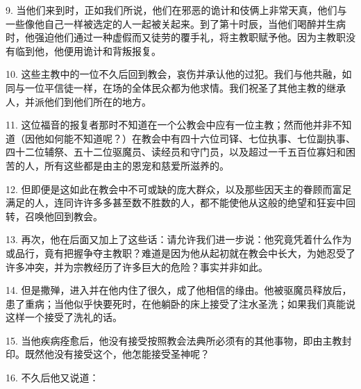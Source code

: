 \par

\par

9. 当他们来到时，正如我们所说，他们在邪恶的诡计和伎俩上非常天真，他们与一些像他自己一样被选定的人一起被关起来。到了第十时辰，当他们喝醉并生病时，他强迫他们通过一种虚假而又徒劳的覆手礼，将主教职赋予他。因为主教职没有临到他，他便用诡计和背叛报复。\par

10. 这些主教中的一位不久后回到教会，哀伤并承认他的过犯。我们与他共融，如同与一位平信徒一样，在场的全体民众都为他求情。我们祝圣了其他主教的继承人，并派他们到他们所在的地方。\par

11. 这位福音的报复者那时不知道在一个公教会中应有一位主教；然而他并非不知道（因他如何能不知道呢？）在教会中有四十六位司铎、七位执事、七位副执事、四十二位辅祭、五十二位驱魔员、读经员和守门员，以及超过一千五百位寡妇和困苦的人，所有这些都是由主的恩宠和慈爱所滋养的。\par

12. 但即便是这如此在教会中不可或缺的庞大群众，以及那些因天主的眷顾而富足满足的人，连同许许多多甚至数不胜数的人，都不能使他从这般的绝望和狂妄中回转，召唤他回到教会。\par

13. 再次，他在后面又加上了这些话：请允许我们进一步说：他究竟凭着什么作为或品行，竟有把握争夺主教职？难道是因为他从起初就在教会中长大，为她忍受了许多冲突，并为宗教经历了许多巨大的危险？事实并非如此。\par

14. 但是撒殚，进入并在他内住了很久，成了他相信的缘由。他被驱魔员释放后，患了重病；当他似乎快要死时，在他躺卧的床上接受了注水圣洗；如果我们真能说这样一个接受了洗礼的话。\par

15. 当他疾病痊愈后，他没有接受按照教会法典所必须有的其他事物，即由主教封印。既然他没有接受这个，他怎能接受圣神呢？\par

16. 不久后他又说道：\par

